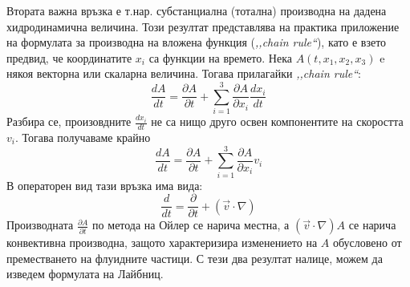 Втората важна връзка е т.нар. субстанциална (тотална) производна на дадена хидродинамична величина. Този резултат представлява на практика приложение на формулата
за производна на вложена функция (\textit{,,chain rule``}), като е взето предвид, че координатите $x_i$ са функции на времето.
Нека $A(t, x_1,x_2,x_3)$ e някоя векторна или скаларна величина. Тогава прилагайки \textit{,,chain rule``}:
\begin{equation*}
	\frac{d A}{d t}=\frac{\partial A}{\partial t}+\sum _{i=1}^3 \frac{\partial A}{\partial x_i}\frac{d x_i}{d t}
\end{equation*}
Разбира се, произовдните $\frac{d x_i}{d t}$ не са нищо друго освен компонентите на скоростта $v_i$. Тогава получаваме крайно
\begin{equation}
	\label{eq:total_der}
	\frac{d A}{d t}=\frac{\partial A}{\partial t}+\sum _{i=1}^3 \frac{\partial A}{\partial x_i} v_i
\end{equation}
В операторен вид тази връзка има вида:
\begin{equation}
	\label{eq:total_der_op}
	\frac{d}{d t} = \frac{\partial}{\partial t} + (\vec{v} \cdot \nabla)
\end{equation}
Производната $\frac{\partial A}{\partial t}$ по метода на Ойлер се нарича местна, а $(\vec{v} \cdot \nabla)A$ се нарича конвективна производна, защото характеризира изменението на $A$ обусловено
от преместването на флуидните частици. С тези два резултат налице, можем да изведем формулата на Лайбниц.

